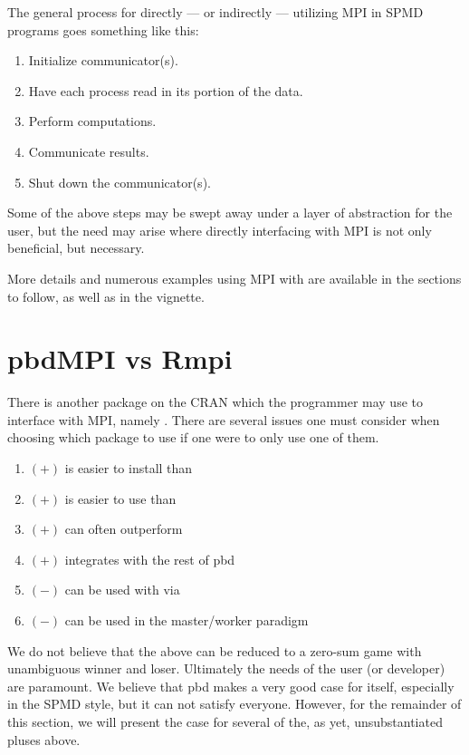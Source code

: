 The general process for directly --- or indirectly --- utilizing MPI in SPMD programs goes something like this:

\begin{enumerate}
 \item Initialize communicator(s).
 \item Have each process read in its portion of the data.
 \item Perform computations.
 \item Communicate results.
 \item Shut down the communicator(s).
\end{enumerate}

Some of the above steps may be swept away under a layer of abstraction for the user, but the need may arise where directly interfacing with MPI is not only beneficial, but necessary.

More details and numerous examples using MPI with  are available in the sections to follow, as well as in the  vignette.





\section{pbdMPI vs Rmpi}

There is another package on the CRAN which the  programmer may use to interface with MPI, namely  \citep{Rmpi}.  There are several issues one must consider when choosing which package to use if one were to only use one of them.
\begin{enumerate}
 \item $(+)$  is easier to install than 
 \item $(+)$  is easier to use than 
 \item\label{enum:perf} $(+)$  can often outperform 
 \item\label{enum:integrate} $(+)$  integrates with the rest of pbd
 \item\label{enum:dompi} $(-)$  can be used with  \citep{foreach} via  \citep{dompi}
 \item $(-)$  can be used in the master/worker paradigm
\end{enumerate}

We do not believe that the above can be reduced to a zero-sum game with unambiguous winner and loser.  Ultimately the needs of the user (or developer) are paramount.  We believe that pbd makes a very good case for itself, especially in the SPMD style, but it can not satisfy everyone.  However, for the remainder of this section, we will present the case for several of the, as yet, unsubstantiated pluses above.

